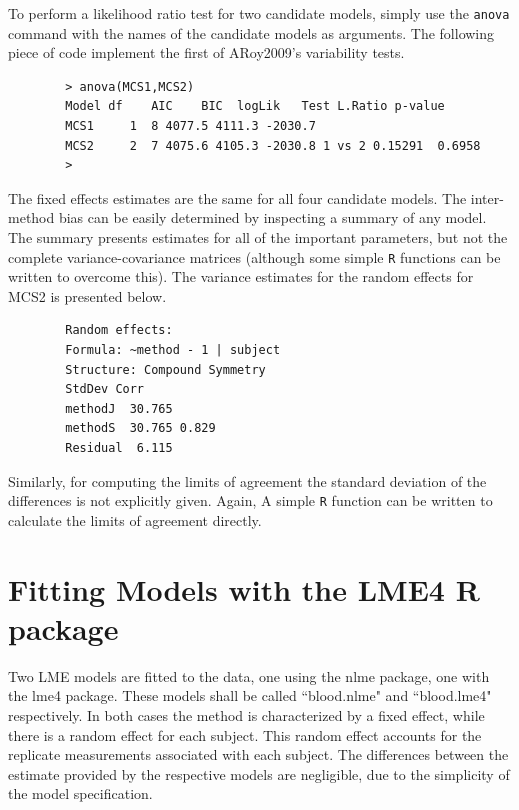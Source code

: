 \documentclass[12pt, a4paper]{report}
\theoremstyle{plain}
\theoremstyle{definition}
\theoremstyle{remark}
\begin{document}
	
	To perform a likelihood ratio test for two candidate models, simply use the \texttt{anova} command with the names of the candidate models as arguments. The following piece of code implement the first of ARoy2009's variability tests.
	
	\begin{framed}
		\begin{verbatim}
		> anova(MCS1,MCS2)
		Model df    AIC    BIC  logLik   Test L.Ratio p-value
		MCS1     1  8 4077.5 4111.3 -2030.7
		MCS2     2  7 4075.6 4105.3 -2030.8 1 vs 2 0.15291  0.6958
		>
		\end{verbatim}
	\end{framed}
	
	The fixed effects estimates are the same for all four candidate models. The inter-method bias can be easily determined by inspecting a summary of any model. The summary presents estimates for all of the important parameters, but not the complete variance-covariance matrices (although some simple \texttt{R} functions can be written to overcome this). The variance estimates for the random effects for MCS2 is presented below.
	
	\begin{framed}
		\begin{verbatim}
		Random effects:
		Formula: ~method - 1 | subject
		Structure: Compound Symmetry
		StdDev Corr
		methodJ  30.765
		methodS  30.765 0.829
		Residual  6.115
		\end{verbatim}
	\end{framed}
	\vspace{1cm}
	Similarly, for computing the limits of agreement the standard deviation of the differences is not explicitly given. Again, A simple \texttt{R} function can be written to calculate the limits of agreement directly.
	
	
	
	\section{Fitting Models with the LME4 R package}
	Two LME models are fitted to the data, one using the nlme package, one with the lme4 package. These models shall be called ``blood.nlme" and ``blood.lme4" respectively.
	In both cases the method is characterized by a fixed effect, while there is a random effect for each subject.
	This random effect accounts for the replicate measurements associated with each subject.
	The differences between the estimate provided by the respective models are negligible, due to the simplicity of the model specification.
	
\end{document}
